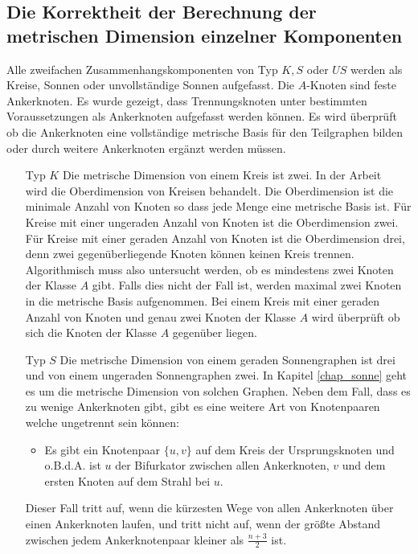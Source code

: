 \subsection{Die Korrektheit der Berechnung der metrischen Dimension einzelner Komponenten}
\label{korrkomp}\vspace{-3mm}
Alle zweifachen Zusammenhangskomponenten von Typ $K,S$ oder $US$ werden als Kreise, Sonnen oder unvollständige Sonnen aufgefasst. Die $A$-Knoten sind feste Ankerknoten. Es wurde gezeigt, dass Trennungsknoten unter bestimmten Voraussetzungen als Ankerknoten aufgefasst werden können. Es wird überprüft ob die Ankerknoten eine vollständige metrische Basis für den Teilgraphen bilden oder durch weitere Ankerknoten ergänzt werden müssen.
\begin{itemize}
\item[Typ $K$]
Die metrische Dimension von einem Kreis ist zwei. In der Arbeit \grqq$\;$\cite{upper} wird die Oberdimension von Kreisen behandelt. Die Oberdimension ist die minimale Anzahl von Knoten so dass jede Menge eine metrische Basis ist.\newline
Für Kreise mit einer ungeraden Anzahl von Knoten ist die Oberdimension zwei.\newline
Für Kreise mit einer geraden Anzahl von Knoten ist die Oberdimension drei, denn zwei gegenüberliegende Knoten können keinen Kreis trennen. Algorithmisch muss also untersucht werden, ob es mindestens zwei Knoten der Klasse $A$ gibt. Falls dies nicht der Fall ist, werden maximal zwei Knoten in die metrische Basis aufgenommen. Bei einem Kreis mit einer geraden Anzahl von Knoten und genau zwei Knoten der Klasse $A$ wird überprüft ob sich die Knoten der Klasse $A$ gegenüber liegen.
\item[Typ $S$]
Die metrische Dimension von einem geraden Sonnengraphen ist drei und von einem ungeraden Sonnengraphen zwei.
In Kapitel \ref{chap_sonne} geht es um die metrische Dimension von solchen Graphen. Neben dem Fall, dass es zu wenige Ankerknoten gibt, gibt es eine weitere Art von Knotenpaaren welche ungetrennt sein können:
\begin{itemize}
\item Es gibt ein Knotenpaar $\{u,v\}$ auf dem Kreis der Ursprungsknoten und o.B.d.A. ist $u$ der Bifurkator zwischen allen Ankerknoten, $v$ und dem ersten Knoten auf dem Strahl bei $u$.
\end{itemize}
Dieser Fall tritt auf, wenn die kürzesten Wege von allen Ankerknoten über einen Ankerknoten laufen, und tritt nicht auf, wenn der größte Abstand zwischen jedem Ankerknotenpaar kleiner als $\frac{n+3}{2}$ ist. 

\end{itemize}
